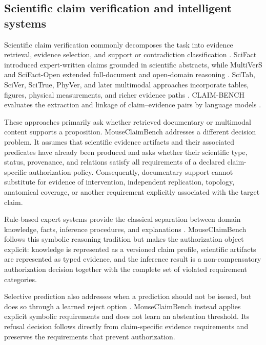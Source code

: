 \documentclass[11pt,a4paper]{article}
\begin{document}
\subsection{Scientific claim verification and intelligent systems}
\label{subsec:claims-assurance}

Scientific claim verification commonly decomposes the task into evidence
retrieval, evidence selection, and support or contradiction classification
\citep{vladika2023survey}. SciFact introduced expert-written claims grounded
in scientific abstracts, while MultiVerS and SciFact-Open extended
full-document and open-domain reasoning
\citep{wadden2020scifact,wadden2022multivers,wadden2022scifactopen}.
SciTab, SciVer, SciTrue, PhyVer, and later multimodal approaches incorporate
tables, figures, physical measurements, and richer evidence paths
\citep{lu2023scitab,wang2025sciver,tan2026scitrue,chen2026phyver,zhang2026mever}.
CLAIM-BENCH evaluates the extraction and linkage of claim--evidence pairs by
language models \citep{javaji2025claimbench}.

These approaches primarily ask whether retrieved documentary or multimodal
content supports a proposition. MouseClaimBench addresses a different
decision problem. It assumes that scientific evidence artifacts and their
associated predicates have already been produced and asks whether their
scientific type, status, provenance, and relations satisfy all requirements of
a declared claim-specific authorization policy. Consequently, documentary
support cannot substitute for evidence of intervention, independent
replication, topology, anatomical coverage, or another requirement explicitly
associated with the target claim.

Rule-based expert systems provide the classical separation between domain
knowledge, facts, inference procedures, and explanations
\citep{buchanan1984rulebased,studer1998knowledge}. MouseClaimBench follows
this symbolic reasoning tradition but makes the authorization object explicit:
knowledge is represented as a versioned claim profile, scientific artifacts are
represented as typed evidence, and the inference result is a
non-compensatory authorization decision together with the complete set of
violated requirement categories.

Selective prediction also addresses when a prediction should not be issued,
but does so through a learned reject option \citep{geifman2019selectivenet}.
MouseClaimBench instead applies explicit symbolic requirements and does not
learn an abstention threshold. Its refusal decision follows directly from
claim-specific evidence requirements and preserves the requirements that
prevent authorization.
\end{document}
